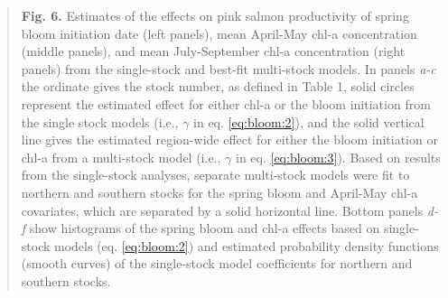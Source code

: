 \begin{quote}
\textbf{Fig. 6.} Estimates of the effects on pink salmon productivity of
spring bloom initiation date (left panels), mean April-May chl-a
concentration (middle panels), and mean July-September chl-a
concentration (right panels) from the single-stock and best-fit
multi-stock models. In panels \emph{a-c} the ordinate gives the stock
number, as defined in Table 1, solid circles represent the estimated
effect for either chl-a or the bloom initiation from the single stock
models (i.e., \(\gamma\) in eq. \ref{eq:bloom:2}), and the solid vertical line gives
the estimated region-wide effect for either the bloom initiation or
chl-a from a multi-stock model (i.e., \(\gamma\) in eq. \ref{eq:bloom:3}). Based on
results from the single-stock analyses, separate multi-stock models were
fit to northern and southern stocks for the spring bloom and April-May
chl-a covariates, which are separated by a solid horizontal line. Bottom
panels \emph{d-f} show histograms of the spring bloom and chl-a effects
based on single-stock models (eq. \ref{eq:bloom:2}) and estimated probability density
functions (smooth curves) of the single-stock model coefficients for
northern and southern stocks.
\end{quote}
